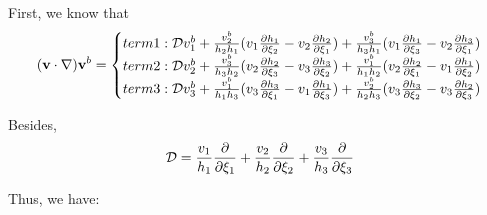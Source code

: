 \documentclass{Note}
\begin{document}
First, we know that
\begin{equation}
\begin{aligned}
(\textbf{v}\cdot \nabla )\textbf{v}^b=
\left\{\begin{matrix}
term1:\mathcal{D}v_1^b+{v_2^b\over{h_2h_1}}(v_1{{\partial h_1}\over {\partial \xi_2}}-v_2{{\partial h_2}\over {\partial \xi_1}})+{v_3^b\over{h_3h_1}}(v_1{{\partial h_1}\over {\partial \xi_3}}-v_2{{\partial h_3}\over {\partial \xi_1}})\\
term2:\mathcal{D}v_2^b+{v_3^b\over{h_3h_2}}(v_2{{\partial h_2}\over {\partial \xi_3}}-v_3{{\partial h_3}\over {\partial \xi_2}})+{v_1^b\over{h_1h_2}}(v_2{{\partial h_2}\over {\partial \xi_1}}-v_1{{\partial h_1}\over {\partial \xi_2}})\\
term3:\mathcal{D}v_3^b+{v_1^b\over{h_1h_3}}(v_3{{\partial h_3}\over {\partial \xi_1}}-v_1{{\partial h_1}\over {\partial \xi_3}})+{v_2^b\over{h_2h_3}}(v_3{{\partial h_3}\over {\partial \xi_2}}-v_3{{\partial h_2}\over {\partial \xi_3}})\\
\end{matrix}\right.
\end{aligned}
\end{equation}

Besides,
\begin{equation}
\begin{aligned}
\mathcal{D}={v_1\over{h_1}}{\partial \over {\partial \xi_1}}+{v_2\over{h_2}}{\partial \over {\partial \xi_2}}+{v_3\over{h_3}}{\partial \over {\partial \xi_3}}
\end{aligned}
\end{equation}

Thus, we have:
\end{document}
